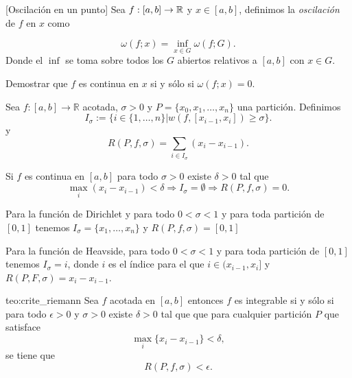 \begin{definicion}{}[Oscilación en un punto] Sea $f:[a,b]\to\mathbb{R}$ y $x\in [a,b]$, definimos la  \emph{oscilación} de $f$ en $x$ como

\[
 \omega(f;x)=\inf\limits_{x\in G}\omega(f;G).
\]
Donde el $\inf$ se toma sobre todos los $G$ abiertos relativos a $[a,b]$ con $x\in G$.  

 
\end{definicion}

\begin{ejercicio}{}
 Demostrar que $f$ es continua en $x$ si y sólo si $\omega(f;x)=0$.
\end{ejercicio}




\begin{definicion}{} Sea $f:[a,b]\to\mathbb{R}$ acotada, $\sigma>0$ y $P=\{x_0,x_1,\ldots,x_n\}$ una partición. Definimos
\[
 I_{\sigma}:=\{i\in\{1,\ldots,n\}|w(f,[x_{i-1},x_i])\geq\sigma\}.
\]
y
\[
 R(P,f,\sigma)=\sum_{i\in I_{\sigma}}(x_i-x_{i-1}).
\]
\end{definicion}





\begin{proposicion}{} Si $f$ es continua en $[a,b]$ para todo $\sigma>0$ existe $\delta>0$ tal que 
\[
\max_i(x_i-x_{i-1})<\delta\Rightarrow I_{\sigma}=\emptyset\Rightarrow R(P,f,\sigma)=0. 
\]

 
\end{proposicion}

\begin{ejemplo}{} Para la función de Dirichlet y para todo $0<\sigma<1$ y para toda partición de $[0,1]$ tenemos $I_{\sigma}=\{x_1,\ldots,x_n\}$ y $R(P,f,\sigma)=[0,1]$
 
\end{ejemplo}

\begin{ejemplo}{} Para la función de Heavside,   para todo $0<\sigma<1$ y para toda partición de $[0,1]$ tenemos $I_{\sigma}=i$, donde $i$ es el índice para el que $i\in (x_{i-1},x_i]$ y $R(P,F,\sigma)=x_i-x_{i-1}$.
 
\end{ejemplo}

\begin{teorema}{teo:crite_riemann} Sea $f$ acotada en $[a,b]$ entonces $f$ es integrable si y sólo si  para todo $\epsilon>0$ y $\sigma>0$ existe $\delta>0$ tal que que para cualquier partición $P$ que satisface
\[\max_i\{x_i-x_{i-1}\}<\delta,\]
se tiene que
\[R(P,f,\sigma)<\epsilon.\]
\end{teorema}

